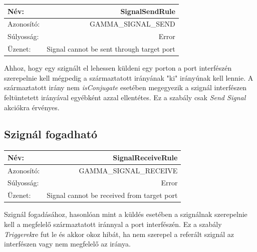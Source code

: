 \begin{tabular}{ | l | r | }
	\hline
	Név: & SignalSendRule  \\ 
	\hline
	Azonosító: & GAMMA\_SIGNAL\_SEND \\
	\hline
	Súlyosság: & Error \\  
	\hline
	Üzenet: & Signal cannot be sent through target port \\
	\hline
\end{tabular}\newline
\newline
Ahhoz, hogy egy szignált el lehessen küldeni egy porton a port interfészén szerepelnie kell mégpedig a származtatott irányának "ki" irányúnak kell lennie. A származtatott irány nem \emph{isConjugate} esetében megegyezik a szignál interfészen feltüntetett irányával egyébként azzal ellentétes. Ez a szabály csak \emph{Send Signal} akciókra érvényes.

\subsection{Szignál fogadható}

\begin{tabular}{ | l | r | }
	\hline
	Név: & SignalReceiveRule  \\ 
	\hline
	Azonosító: & GAMMA\_SIGNAL\_RECEIVE \\
	\hline
	Súlyosság: & Error \\  
	\hline
	Üzenet: & Signal cannot be received from target port \\
	\hline
\end{tabular}\newline
\newline
Szignál fogadásához, hasonlóan mint a küldés esetében a szignálnak szerepelnie kell a megfelelő származtatott iránnyal a port interfészén. Ez a szabály \emph{Triggerek}re fut le és akkor okoz hibát, ha nem szerepel a referált szignál az interfészen vagy nem megfelelő az iránya.

